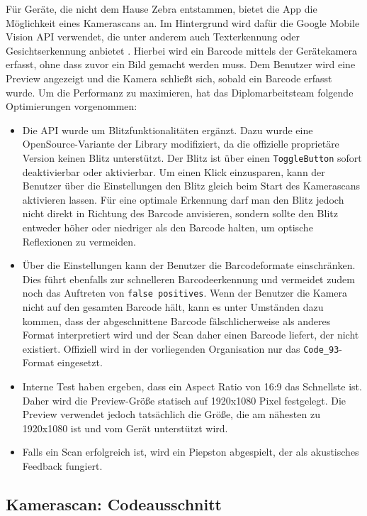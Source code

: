 Für Geräte, die nicht dem Hause Zebra entstammen, bietet die App die
Möglichkeit eines Kamerascans an. Im Hintergrund wird dafür die Google
Mobile Vision API verwendet, die unter anderem auch Texterkennung oder
Gesichtserkennung anbietet \cite{mobile-vision}. Hierbei wird ein
Barcode mittels der Gerätekamera erfasst, ohne dass zuvor ein Bild
gemacht werden muss. Dem Benutzer wird eine Preview angezeigt und die
Kamera schließt sich, sobald ein Barcode erfasst wurde. Um die
Performanz zu maximieren, hat das Diplomarbeitsteam folgende
Optimierungen vorgenommen:

\begin{itemize}
\tightlist
\item
  Die API wurde um Blitzfunktionalitäten ergänzt. Dazu wurde eine
  OpenSource-Variante der Library modifiziert, da die offizielle
  proprietäre Version keinen Blitz unterstützt. Der Blitz ist über einen
  \texttt{ToggleButton} sofort deaktivierbar oder aktivierbar. Um einen
  Klick einzusparen, kann der Benutzer über die Einstellungen den Blitz
  gleich beim Start des Kamerascans aktivieren lassen. Für eine optimale
  Erkennung darf man den Blitz jedoch nicht direkt in Richtung des
  Barcode anvisieren, sondern sollte den Blitz entweder höher oder
  niedriger als den Barcode halten, um optische Reflexionen zu
  vermeiden.
\item
  Über die Einstellungen kann der Benutzer die Barcodeformate
  einschränken. Dies führt ebenfalls zur schnelleren Barcodeerkennung
  und vermeidet zudem noch das Auftreten von \texttt{false\ positives}.
  Wenn der Benutzer die Kamera nicht auf den gesamten Barcode hält, kann
  es unter Umständen dazu kommen, dass der abgeschnittene Barcode
  fälschlicherweise als anderes Format interpretiert wird und der Scan
  daher einen Barcode liefert, der nicht existiert. Offiziell wird in
  der vorliegenden Organisation nur das \texttt{Code\_93}-Format
  eingesetzt.
\item
  Interne Test haben ergeben, dass ein Aspect Ratio von 16:9 das
  Schnellste ist. Daher wird die Preview-Größe statisch auf 1920x1080
  Pixel festgelegt. Die Preview verwendet jedoch tatsächlich die Größe,
  die am nähesten zu 1920x1080 ist und vom Gerät unterstützt wird.
\item
  Falls ein Scan erfolgreich ist, wird ein Piepston abgespielt, der als
  akustisches Feedback fungiert.
\end{itemize}

\hypertarget{kamerascan-codeausschnitt}{%
\subsection{Kamerascan:
Codeausschnitt}\label{kamerascan-codeausschnitt}}

